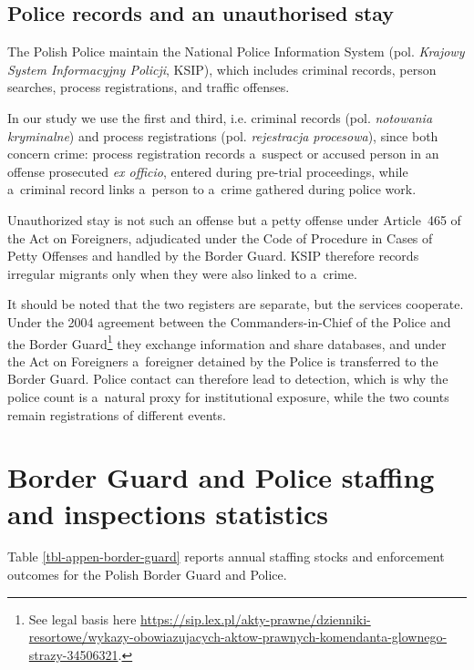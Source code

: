 \clearpage

\subsection{Police records and an unauthorised stay}\label{sec-appen-police}

The Polish Police maintain the National Police Information System
(pol. \emph{Krajowy System Informacyjny Policji}, KSIP), which includes criminal records, person searches, process registrations, and traffic offenses. 

In our study we use the first and third, i.e. criminal
records (pol. \emph{notowania kryminalne}) and process registrations
(pol. \emph{rejestracja procesowa}), since both concern crime: process
registration records a~suspect or accused person in an offense prosecuted
\emph{ex officio}, entered during pre-trial proceedings, while a~criminal
record links a~person to a~crime gathered during police work.

Unauthorized stay is not such an offense but a petty offense under
Article~465 of the Act on Foreigners, adjudicated under the Code of
Procedure in Cases of Petty Offenses and handled by the Border Guard. KSIP therefore records irregular migrants only when they were also linked to a~crime.

It should be noted that the two registers are separate, but the services cooperate. Under the 2004 agreement between the Commanders-in-Chief of the Police and the Border Guard\footnote{See legal basis here \url{https://sip.lex.pl/akty-prawne/dzienniki-resortowe/wykazy-obowiazujacych-aktow-prawnych-komendanta-glownego-strazy-34506321}. } they exchange information and share databases, and under the Act on Foreigners a~foreigner detained by the Police is transferred to the Border Guard. Police contact can therefore lead to detection, which is why the police count is a~natural proxy for institutional exposure, while the two counts remain registrations of different events.

\clearpage

\section{Border Guard and Police staffing and inspections
statistics}\label{sec-appen-more-on-border-guards}

Table \ref{tbl-appen-border-guard} reports annual staffing stocks and
enforcement outcomes for the Polish Border Guard and Police.

